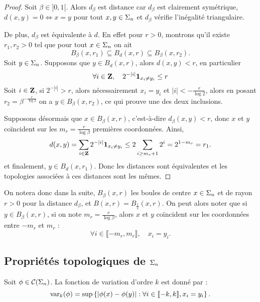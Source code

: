   \begin{proof}
    Soit $\beta \in ]0, 1[$. Alors $d_{\beta}$ est distance car $d_{\beta}$ est clairement symétrique, $d(x, y) = 0 \iff x = y$ pour tout $x,y\in\Sigma_n$
    et $d_{\beta}$ vérifie l'inégalité triangulaire.

    De plus, $d_{\beta}$ est équivalente à $d$. En effet pour $r > 0$, montrons qu'il existe $r_1, r_2 > 0$ tel que pour tout $x \in \Sigma_n$ on ait
    $$B_{\beta}(x, r_1) \subseteq  B_d(x, r) \subseteq B_{\beta}(x, r_2).$$
    Soit $y \in \Sigma_n$. Supposons que $y \in B_d(x, r)$, alors $d(x, y) < r$, en particulier
    $$\forall i \in \mathbf Z, \hspace{1em}2^{-|i|}\mathbf{1}_{x_i \not= y_i} \leq r$$
    Soit $i \in \mathbf Z$, si $2^{-|i|} > r$, alors nécessairement $x_i = y_i$ et $|i| < -\frac{r}{\log{2}}$,
    alors en posant $r_2 = \beta^{-\frac{r}{\log{2}}}$ on a $y \in B_{\beta}(x, r_2)$, ce qui prouve une des deux inclusions.

    Supposons désormais que $x \in B_{\beta}(x, r)$, c'est-à-dire $d_{\beta}(x, y) < r$,
    donc $x$ et $y$ coïncident sur les $m_r = \frac{r}{\log{\beta}}$ premières coordonnées.
    Ainsi,
    $$d(x, y) = \sum_{i\in\mathbf Z}{2^{-|i|}\mathbf{1}_{x_i \not= y_i}} \leq 2\sum_{i \geq m_r + 1}{2^i} = 2^{1 - m_r} = r_1.$$
    et finalement, $y \in B_d(x, r_1)$. Donc les distances sont équivalentes et les topologies associées à ces distances sont les mêmes.
  \end{proof}

  On notera donc dans la suite, $B_{\beta}(x, r)$ les boules de centre $x \in \Sigma_n$ et de rayon $r > 0$ pour la distance $d_{\beta}$,
  et $B(x, r) = B_{\frac 1 2}(x, r)$.
  On peut alors noter que si $y \in B_{\beta}(x, r)$, si on note $m_r = \frac{r}{\log{\beta}}$, alors $x$ et $y$ coïncident sur les coordonnées entre
  $-m_r$ et $m_r$ :
  $$\forall i \in \llbracket -m_r, m_r \rrbracket, \hspace{1em} x_i = y_i.$$

  \subsection{Propriétés topologiques de $\Sigma_n$}

  \begin{definition}
    Soit $\phi \in \mathcal{C} (\Sigma_{n})$. La fonction de variation d'ordre $k$ est donné par :
    $$\operatorname{var}_k(\phi) = \sup\left\{|\phi(x) - \phi(y)| : \forall i \in \llbracket -k, k\rrbracket, x_i = y_i \right\}.$$
  \end{definition}

